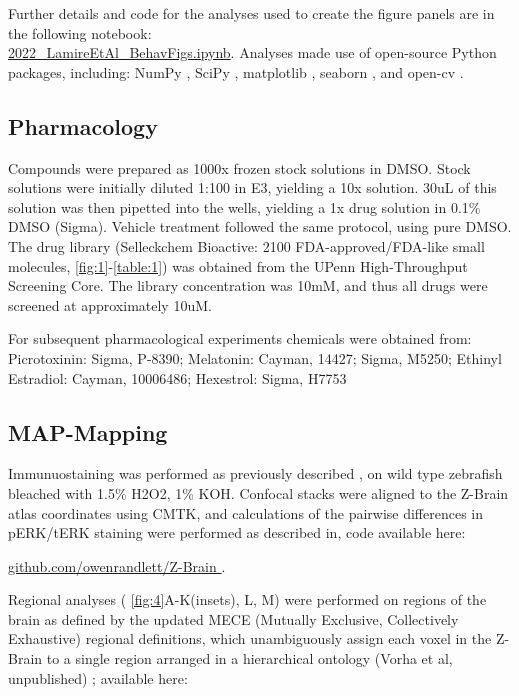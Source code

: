 \documentclass[9pt,lineno]{RandlettLab_elife}
\begin{document}
Further details and code for the analyses used to create the figure panels are in the following notebook:
\\ \href{https://nbviewer.org/github/owenrandlett/lamire_2022/blob/main/2022_LamireEtAl_BehavFigs.ipynb}{2022\_LamireEtAl\_BehavFigs.ipynb}. Analyses made use of open-source Python packages, including: NumPy \cite{Harris2020-bg}, SciPy \cite{Virtanen2020-sz}, matplotlib \cite{Hunter2007-ub}, seaborn \cite{Waskom2021-ah}, and open-cv \cite{Bradski2000-qo}.

\subsection{Pharmacology}

Compounds were prepared as 1000x frozen stock solutions in DMSO. Stock solutions were initially diluted 1:100 in E3, yielding a 10x solution. 30uL of this solution was then pipetted into the wells, yielding a 1x drug solution in 0.1\% DMSO (Sigma). Vehicle treatment followed the same protocol, using pure DMSO. The drug library (Selleckchem Bioactive: 2100 FDA-approved/FDA-like small molecules, \autoref{fig:1}-\autoref{table:1}) was obtained from the UPenn High-Throughput Screening Core. The library concentration was 10mM, and thus all drugs were screened at approximately 10uM. 

For subsequent pharmacological experiments chemicals were obtained from: Picrotoxinin: Sigma, P-8390; Melatonin: Cayman, 14427; Sigma, M5250; Ethinyl Estradiol: Cayman, 10006486; Hexestrol: Sigma, H7753

\subsection{MAP-Mapping}

Immunuostaining was performed as previously described \cite{Randlett2015-hy}, on wild type zebrafish bleached with 1.5\% H2O2, 1\% KOH. Confocal stacks were aligned to the Z-Brain atlas coordinates using CMTK, and calculations of the pairwise differences in pERK/tERK staining were performed as described in, code available here:

\href{https://github.com/owenrandlett/Z-Brain }{github.com/owenrandlett/Z-Brain }.  

Regional analyses ( \autoref{fig:4}A-K(insets), L, M) were performed on regions of the brain as defined by the updated MECE (Mutually Exclusive, Collectively Exhaustive) regional definitions, which unambiguously assign each voxel in the Z-Brain to a single region arranged in a hierarchical ontology (Vorha et al, unpublished) ; available here:
\end{document}
